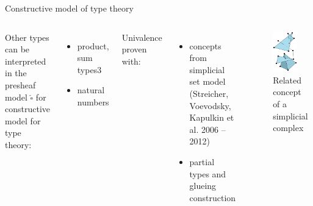 \documentclass[english,draft]{beamer}
\begin{document}
\begin{frame}{Constructive model of type theory}{}
 


 \begin{columns}[c]
         Other types can be interpreted in the presheaf model  $\widehat{\square}$
          for constructive model for type theory:
 \begin{itemize}
  \item product, sum types3
  \item natural numbers
 \end{itemize}
 
        Univalence proven with:
        
       \begin{itemize}
        \item concepts from simplicial set model (Streicher, Voevodsky, Kapulkin et al. 2006 -- 2012)
        \item partial types and glueing construction 
       \end{itemize}
        \begin{figure}
       \includegraphics[width=0.7\textwidth]{figures/simplex}
       \caption{Related concept of a simplicial complex}
       \end{figure}
\end{columns}
 
\end{frame}
\end{document}
